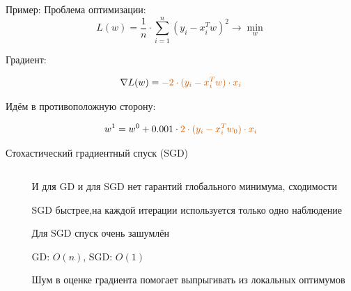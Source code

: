 \documentclass[notes,12pt, aspectratio=169]{beamer}
\newenvironment{wideitemize}{\itemize\addtolength{\itemsep}{10pt}}{\enditemize}
\begin{document}
\begin{frame}[fragile]{Пример:}
Проблема оптимизации: 
\[   
L(w) = \frac{1}{n} \cdot \sum_{i=1}^n  (y_i - x_i^T w)^2 \to \min_{w}
\]

Градиент: 

\[   
\nabla L(w) =  { \color{red} - 2 \cdot (y_i - x_i^T w)\cdot x_i }
\]

Идём в противоположную сторону: 

\[
w^1 =   w^0  +  0.001 \cdot   {\color{red}  2 \cdot (y_i - x_i^T w_0)\cdot x_i }
\]
\end{frame}


\begin{frame}{Стохастический градиентный спуск (SGD)}
\begin{columns}[T] %
	\begin{column}{.5\textwidth}
	\end{column}%
	\hfill%
	\begin{column}{.5\textwidth}
		\begin{wideitemize}
			\item И для GD и для SGD нет гарантий глобального минимума, сходимости
			\item SGD быстрее,на каждой итерации используется только одно наблюдение
			\item Для SGD спуск очень зашумлён 
			\item  GD: $O(n)$, SGD: $O(1)$
			\item Шум в оценке градиента помогает выпрыгивать из локальных оптимумов
		\end{wideitemize}
	\end{column}%
\end{columns}
\end{frame}
\end{document}
